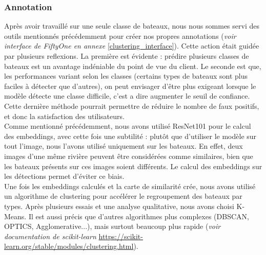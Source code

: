 \subsubsection{Annotation}

Après avoir travaillé sur une seule classe de bateaux, nous nous sommes servi des outils mentionnés précédemment
pour créer nos propres annotations (\textit{voir interface de FiftyOne en annexe }\ref{clustering_interface}).
Cette action était guidée par plusieurs reflexions. La première est évidente :
prédire plusieurs classes de bateaux est un avantage indéniable du point de vue du client.
Le seconde est que, les performances variant selon les classes (certains types de bateaux sont plus faciles à
détecter que d'autres), on peut envisager d'être plus exigeant lorsque le modèle détecte une classe difficile,
c'est a dire augmenter le seuil de confiance. Cette dernière méthode pourrait permettre de réduire
le nombre de faux positifs, et donc la satisfaction des utilisateurs.\\

Comme mentionné précédemment, nous avons utilisé ResNet101 pour le calcul des embeddings,
avec cette fois une subtilité : plutôt que d'utiliser le modèle sur tout l'image, nous
l'avons utilisé uniquement sur les bateaux. En effet, deux images d'une même rivière
peuvent être considérées comme similaires, bien que les bateaux présents sur ces images
soient différents. Le calcul des embeddings sur les détections permet d'éviter ce biais.\\

Une fois les embeddings calculés et la carte de similarité crée, nous avons utilisé un algorithme
de clustering pour accélérer le regroupement des bateaux par types. Après plusieurs essais et une analyse
qualitative, nous avons choisi K-Means. Il est aussi précis que d'autres algorithmes plus complexes (DBSCAN,
OPTICS, Agglomerative...), mais surtout beaucoup plus rapide (\textit{voir documentation
de scikit-learn }\url{https://scikit-learn.org/stable/modules/clustering.html}).

